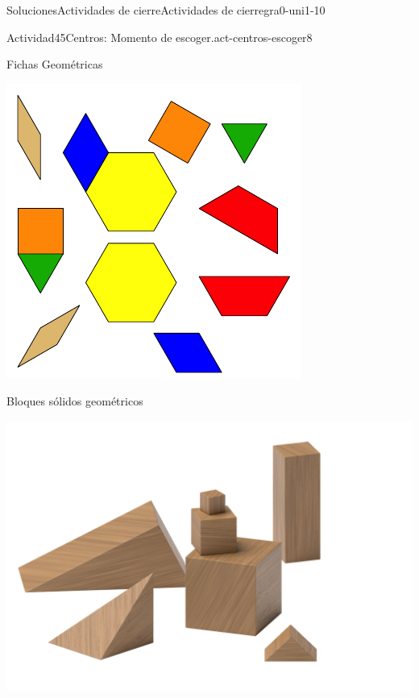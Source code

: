 \documentclass[twoside,10pt,]{article}
\begin{document}
\begin{solutions-section}{Soluciones}{Actividades de cierre}{}{Actividades de cierre}{}{}{gra0-uni1-10}
\begin{activitysolution}{Actividad}{45}{Centros: Momento de escoger.}{act-centros-escoger8}
\begin{sidebyside}{2}{0.025}{0.025}{0.05}
\begin{sbspanel}{0.45}
\end{sbspanel}%
\begin{sbspanel}{0.45}%
Fichas Geométricas%
\par
\includegraphics[width=\linewidth]{external/svg-source/tikz-file-147344.pdf}
\end{sbspanel}%
\end{sidebyside}%
\begin{sidebyside}{2}{0.025}{0.025}{0.05}%
\begin{sbspanel}{0.45}%
Bloques sólidos geométricos%
\par
\includegraphics[width=\linewidth]{external/png-source/K.1.A Beta Student Workbook.Geoblocks.png}

\end{sbspanel}
\end{sidebyside}
\end{activitysolution}
\end{solutions-section}
\end{document}
